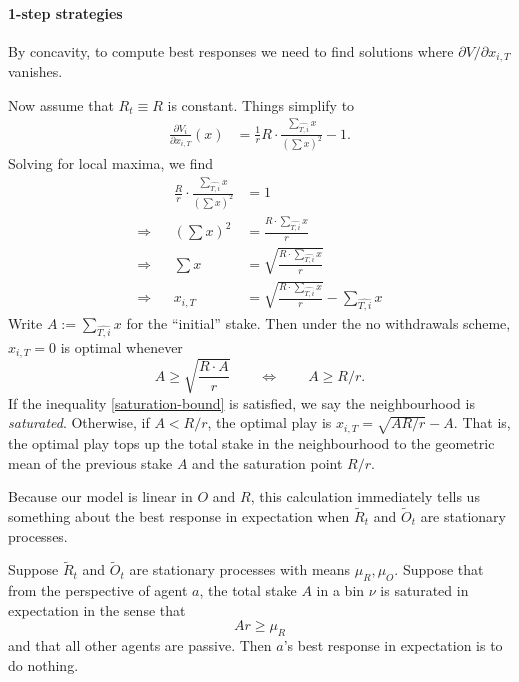 \paragraph{1-step strategies} By concavity, to compute best responses we need to find solutions where $\partial V/\partial x_{i,T}$ vanishes.

Now assume that $R_t\equiv R$ is constant.
%
Things simplify to 
\begin{align*}
  \frac{\partial V_i}{\partial x_{i,T}}(x) &= \frac{1}{r}R \cdot\frac{\sum_{\widehat{T,i}} x}{(\sum x)^2} - 1.
\end{align*}
Solving for local maxima, we find
\begin{align*}
  &&\frac{R}{r}\cdot\frac{\sum_{\widehat{T,i}} x}{(\sum x)^2} &= 1 \\
  \Rightarrow&& (\sum x)^2 &= \frac{R\cdot \sum_{\widehat{T,i}} x}{r} \\
  \Rightarrow&& \sum x &= \sqrt{ \frac{R\cdot \sum_{\widehat{T,i}} x}{r} } \\
  \Rightarrow&& x_{i,T} &= \sqrt{ \frac{R\cdot \sum_{\widehat{T,i}} x}{r} } - \sum_{\widehat{T,i}} x
\end{align*}
Write $A:=\sum_{\widehat{T,i}} x$ for the ``initial'' stake.
%
Then under the no withdrawals scheme, $x_{i,T}=0$ is optimal whenever
\begin{equation} \label{saturation-bound}
  A \geq \sqrt{ \frac{R\cdot A}{r} } \qquad  \Leftrightarrow \qquad A \geq R/r.
\end{equation}
If the inequality \eqref{saturation-bound} is satisfied, we say the neighbourhood is \emph{saturated}.
%
Otherwise, if $A<R/r$, the optimal play is $x_{i,T}=\sqrt{AR/r} - A$.
%
That is, the optimal play tops up the total stake in the neighbourhood to the geometric mean of the previous stake $A$ and the saturation point $R/r$.

Because our model is linear in $O$ and $R$, this calculation immediately tells us something about the best response in expectation when $\tilde{R}_t$ and $\tilde{O}_t$ are stationary processes.
%
\begin{proposition}

  Suppose $\tilde{R}_t$ and $\tilde{O}_t$ are stationary processes with means $\mu_R,\mu_O$.
  Suppose that from the perspective of agent $a$, the total stake $A$ in a bin $\nu$ is saturated in expectation in the sense that
  \[
    Ar \geq \mu_R
  \]
  and that all other agents are passive.
  Then $a$'s best response in expectation is to do nothing.

\end{proposition}

